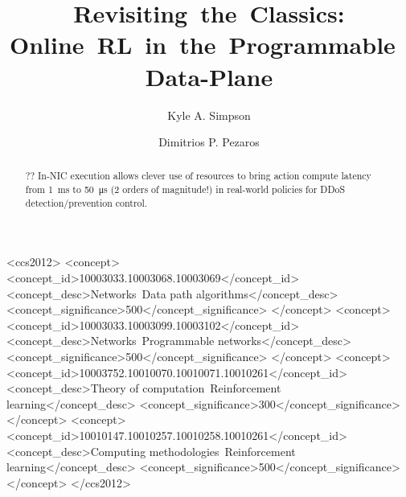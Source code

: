 \documentclass[sigconf,natbib=false]{acmart}
\begin{document}
	\title{Revisiting~the~Classics: Online~RL~in~the~Programmable~Data-Plane}
	
	
	 \author{Kyle A. Simpson}
	 \author{Dimitrios P. Pezaros}
	
\renewcommand{\shortauthors}{Simpson \emph{et al}.}
	
\begin{abstract}
?? In-NIC execution allows clever use of resources to bring action compute latency  from \SI{1}{\milli\second} to \SI{50}{\micro\second} (2 orders of magnitude!) in real-world policies for DDoS detection/prevention control.
\end{abstract}

\begin{CCSXML}
	<ccs2012>
	<concept>
	<concept_id>10003033.10003068.10003069</concept_id>
	<concept_desc>Networks~Data path algorithms</concept_desc>
	<concept_significance>500</concept_significance>
	</concept>
	<concept>
	<concept_id>10003033.10003099.10003102</concept_id>
	<concept_desc>Networks~Programmable networks</concept_desc>
	<concept_significance>500</concept_significance>
	</concept>
	<concept>
	<concept_id>10003752.10010070.10010071.10010261</concept_id>
	<concept_desc>Theory of computation~Reinforcement learning</concept_desc>
	<concept_significance>300</concept_significance>
	</concept>
	<concept>
	<concept_id>10010147.10010257.10010258.10010261</concept_id>
	<concept_desc>Computing methodologies~Reinforcement learning</concept_desc>
	<concept_significance>500</concept_significance>
	</concept>
	</ccs2012>
\end{CCSXML}


	
\maketitle
	
\end{document}
